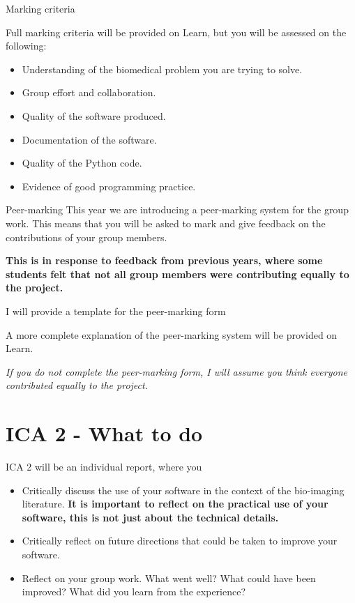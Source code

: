 \documentclass[9pt, aspectratio=169]{beamer}
\begin{document}
\begin{frame}
    {Marking criteria}

    Full marking criteria will be provided on Learn, but you will be assessed on the following:

    \begin{itemize}
        \item Understanding of the biomedical problem you are trying to solve.
        \item Group effort and collaboration.
        \item Quality of the software produced.
        \item Documentation of the software.
        \item Quality of the Python code.
        \item Evidence of good programming practice.
    \end{itemize}
\end{frame}

\begin{frame}
    {Peer-marking}
    This year we are introducing a peer-marking system for the group work. This means that you will be asked to mark and give feedback on the contributions of your group members.

    \textbf{This is in response to feedback from previous years, where some students felt that not all group members were contributing equally to the project.}

    \pause
    I will provide a template for the peer-marking form

    A more complete explanation of the peer-marking system will be provided on Learn.

    \textit{If you do not complete the peer-marking form, I will assume you think everyone contributed equally to the project.}
\end{frame}
\section{ICA 2 - What to do}
\begin{frame}
    ICA 2 will be an individual report, where you

    \begin{itemize}
        \item Critically discuss the use of your software in the context of the bio-imaging literature. \textbf{It is important to reflect on the practical use of your software, this is not just about the technical details.}
        \item Critically reflect on future directions that could be taken to improve your software.
        \item Reflect on your group work. What went well? What could have been improved? What did you learn from the experience?
    \end{itemize}
\end{frame}
\end{document}
